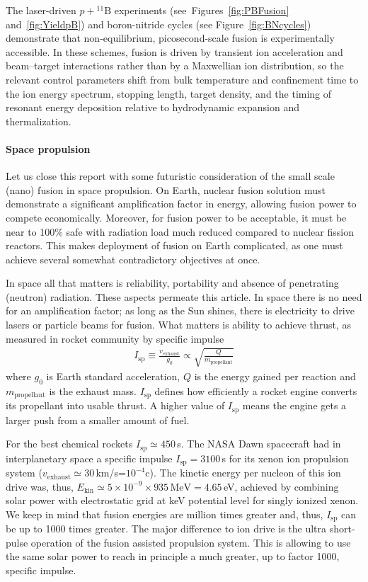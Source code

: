 \documentclass[particles,article,accept,pdftex,moreauthors]{Definitions/mdpi}
\newcommand{\rf}[1]{Figure~\ref{#1}}
\begin{document}
The laser-driven $p+{}^{11}\mathrm{B}$ experiments (see~Figures~\ref{fig:PBFusion} and~\ref{fig:YieldpB}) and boron-nitride cycles (see \rf{fig:BNcycles}) demonstrate that non-equilibrium, picosecond-scale fusion is experimentally accessible. In these schemes, fusion is driven by transient ion acceleration and beam--target interactions rather than by a Maxwellian ion distribution, so the relevant control parameters shift from bulk temperature and confinement time to the ion energy spectrum, stopping length, target density, and the timing of resonant energy deposition relative to hydrodynamic expansion and thermalization. 


\paragraph*{\bf Space propulsion}
Let us close this report with some futuristic consideration of the small scale (nano) fusion in space propulsion. On Earth, nuclear fusion solution must demonstrate a significant amplification factor in energy, allowing fusion power to compete economically. Moreover, for fusion power to be acceptable, it must be near to 100\% safe with radiation load much reduced compared to nuclear fission reactors. This makes deployment of fusion on Earth complicated, as one must achieve several somewhat contradictory objectives at once. 

In space all that matters is reliability, portability and absence of penetrating (neutron) radiation. These aspects permeate this article. In space there is no need for an amplification factor; as long as the Sun shines, there is electricity to drive lasers or particle beams for fusion. What matters is ability to achieve thrust, as measured in rocket community by specific impulse 
\begin{align}
I_\mathrm{sp}\equiv\frac{v_\mathrm{exhaust}}{g_0} \propto \sqrt{\frac{Q}{m_\mathrm{propellant}}}
\end{align}
where $g_0$ is Earth standard acceleration, $Q$ is the energy gained per reaction and $m_\mathrm{propellant}$ is the exhaust mass. $I_\mathrm{sp}$ defines how efficiently a rocket engine converts its propellant into usable thrust. A higher value of $I_\mathrm{sp}$ means the engine gets a larger push from a smaller amount of fuel. 

For the best chemical rockets $I_\mathrm{sp}\simeq 450$\,s. The NASA Dawn spacecraft had in interplanetary space a specific impulse $I_\mathrm{sp}=3100$\,s for its xenon ion propulsion system ($v_\mathrm{exhaust}\simeq 30$\,km/s=$10^{-4}$c). The kinetic energy per nucleon of this ion drive was, thus, $E_\mathrm{kin}\simeq 5\times 10^{-9}\times935\,\mathrm{MeV}=4.65$\,eV, achieved by combining solar power with electrostatic grid at keV potential level for singly ionized xenon. We keep in mind that fusion energies are million times greater and, thus, $I_\mathrm{sp}$ can be up to 1000 times greater. The major difference to ion drive is the ultra short-pulse operation of the fusion assisted propulsion system. This is allowing to use the same solar power to reach in principle a much greater, up to factor 1000, specific impulse.
\end{document}
